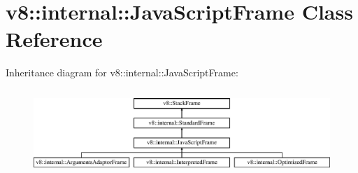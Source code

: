 \hypertarget{classv8_1_1internal_1_1_java_script_frame}{}\section{v8\+:\+:internal\+:\+:Java\+Script\+Frame Class Reference}
\label{classv8_1_1internal_1_1_java_script_frame}
Inheritance diagram for v8\+:\+:internal\+:\+:Java\+Script\+Frame\+:\begin{figure}[H]
\begin{center}
\leavevmode
\includegraphics[height=3.260553cm]{classv8_1_1internal_1_1_java_script_frame}
\end{center}
\end{figure}
